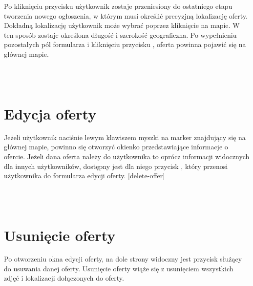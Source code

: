 \newpage

Po kliknięciu przycisku  użytkownik zostaje przeniesiony do ostatniego etapu tworzenia nowego ogłoszenia, w którym musi określić precyzjną lokalizację oferty. Dokładną lokalizację użytkownik może wybrać poprzez kliknięcie na mapie. W ten sposób zostaje określona długość i szerokość geograficzna. Po wypełnieniu pozostałych pól formularza i kliknięciu przycisku , oferta powinna pojawić się na głównej mapie.\\
\\
\begin{minipage}{\linewidth}
\label{add-offer3}
\end{minipage}\\


\section{Edycja oferty}
Jeżeli użytkownik naciśnie lewym klawiszem myszki na marker znajdujący się na głównej mapie, powinno się otworzyć okienko przedstawiające informacje o ofercie. Jeżeli dana oferta należy do użytkownika to oprócz informacji widocznych dla innych użytkowników, dostępny jest dla niego przycisk , który przenosi użytkownika do formularza edycji oferty. \ref{delete-offer}\\
\\
\begin{minipage}{\linewidth}
\label{edit-offer}
\end{minipage}\\


\section{Usunięcie oferty}
Po otworzeniu okna edycji oferty, na dole strony widoczny jest przycisk służący do usuwania danej oferty. Usunięcie oferty wiąże się z usunięciem wszystkich zdjęć i lokalizacji dołączonych do oferty.\\
\\
\begin{minipage}{\linewidth}
\label{delete-offer}
\end{minipage}\\ 

